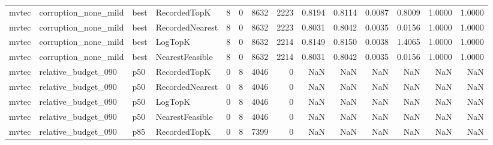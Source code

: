 \begin{tabular}{llllrrrrrrrrrr}
   mvtec & corruption\_none\_mild &   best &    RecordedTopK &           8 &          0 &           8632 &                2223 &         0.8194 &          0.8114 &                    0.0087 &         0.8009 &                 1.0000 &                  1.0000 \\
   mvtec & corruption\_none\_mild &   best & RecordedNearest &           8 &          0 &           8632 &                2223 &         0.8031 &          0.8042 &                    0.0035 &         0.0156 &                 1.0000 &                  1.0000 \\
   mvtec & corruption\_none\_mild &   best &         LogTopK &           8 &          0 &           8632 &                2214 &         0.8149 &          0.8150 &                    0.0038 &         1.4065 &                 1.0000 &                  1.0000 \\
   mvtec & corruption\_none\_mild &   best & NearestFeasible &           8 &          0 &           8632 &                2214 &         0.8031 &          0.8042 &                    0.0035 &         0.0156 &                 1.0000 &                  1.0000 \\
   mvtec &  relative\_budget\_090 &    p50 &    RecordedTopK &           0 &          8 &           4046 &                   0 &            NaN &             NaN &                       NaN &            NaN &                    NaN &                     NaN \\
   mvtec &  relative\_budget\_090 &    p50 & RecordedNearest &           0 &          8 &           4046 &                   0 &            NaN &             NaN &                       NaN &            NaN &                    NaN &                     NaN \\
   mvtec &  relative\_budget\_090 &    p50 &         LogTopK &           0 &          8 &           4046 &                   0 &            NaN &             NaN &                       NaN &            NaN &                    NaN &                     NaN \\
   mvtec &  relative\_budget\_090 &    p50 & NearestFeasible &           0 &          8 &           4046 &                   0 &            NaN &             NaN &                       NaN &            NaN &                    NaN &                     NaN \\
   mvtec &  relative\_budget\_090 &    p85 &    RecordedTopK &           0 &          8 &           7399 &                   0 &            NaN &             NaN &                       NaN &            NaN &                    NaN &                     NaN \\

\end{tabular}
